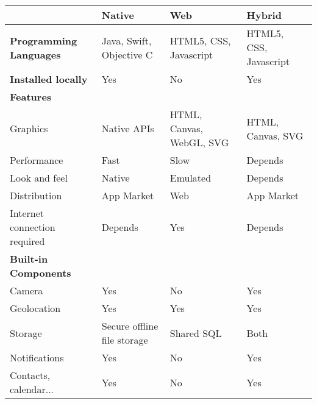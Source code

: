 \begin{table}[H]
\def\tabularxcolumn#1{m{#1}}
\Centering
\captionsetup{justification=centering}
\footnotesize
\begin{tabularx}{15cm}{|X|X|X|X|}
\hline
                               & \textbf{Native}             & \textbf{Web}             & \textbf{Hybrid}        \\ \hline
\textbf{Programming Languages} & Java, Swift, Objective C    & HTML5, CSS, Javascript   & HTML5, CSS, Javascript \\ \hline
\textbf{Installed locally}     & Yes                         & No                       & Yes                    \\ \hline
\textbf{Features}              & \multicolumn{3}{l|}{}                                                           \\ \hline
Graphics                       & Native APIs                 & HTML, Canvas, WebGL, SVG & HTML, Canvas, SVG      \\ \hline
Performance                    & Fast                        & Slow                     & Depends                \\ \hline
Look and feel                  & Native                      & Emulated                 & Depends                \\ \hline
Distribution                   & App Market                  & Web                      & App Market             \\ \hline
Internet connection required   & Depends                     & Yes                      & Depends                \\ \hline
\textbf{Built-in Components}   & \multicolumn{3}{l|}{}                                                           \\ \hline
Camera                         & Yes                         & No                       & Yes                    \\ \hline
Geolocation                    & Yes                         & Yes                      & Yes                    \\ \hline
Storage                        & Secure offline file storage & Shared SQL               & Both                   \\ \hline
Notifications                  & Yes                         & No                       & Yes                    \\ \hline
Contacts, calendar...          & Yes                         & No                       & Yes                    \\ \hline

\end{tabularx}
\end{table}
